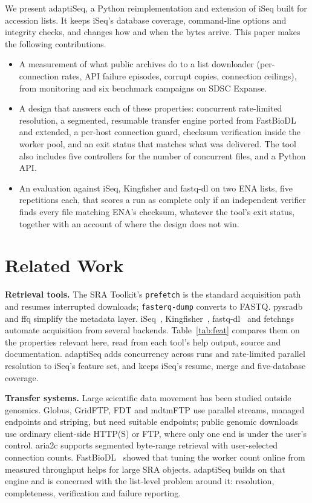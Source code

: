 \documentclass[conference]{IEEEtran}
\begin{document}
We present adaptiSeq, a Python reimplementation and extension of iSeq built for accession lists. It keeps iSeq's database coverage, command-line options and integrity checks, and changes how and when the bytes arrive. This paper makes the following contributions.
\begin{itemize}
\item A measurement of what public archives do to a list downloader (per-connection rates, API failure episodes, corrupt copies, connection ceilings), from monitoring and six benchmark campaigns on SDSC Expanse.
\item A design that answers each of these properties: concurrent rate-limited resolution, a segmented, resumable transfer engine ported from FastBioDL~\cite{fastbiodl} and extended, a per-host connection guard, checksum verification inside the worker pool, and an exit status that matches what was delivered. The tool also includes five controllers for the number of concurrent files, and a Python API.
\item An evaluation against iSeq, Kingfisher and fastq-dl on two ENA lists, five repetitions each, that scores a run as complete only if an independent verifier finds every file matching ENA's checksum, whatever the tool's exit status, together with an account of where the design does not win.
\end{itemize}

\section{Related Work}
\textbf{Retrieval tools.} The SRA Toolkit's \texttt{prefetch} is the standard acquisition path and resumes interrupted downloads; \texttt{fasterq-dump} converts to FASTQ. pysradb~\cite{pysradb} and ffq simplify the metadata layer. iSeq~\cite{iseq}, Kingfisher~\cite{kingfisher}, fastq-dl~\cite{fastqdl} and fetchngs~\cite{fetchngs} automate acquisition from several backends. Table~\ref{tab:feat} compares them on the properties relevant here, read from each tool's help output, source and documentation. adaptiSeq adds concurrency across runs and rate-limited parallel resolution to iSeq's feature set, and keeps iSeq's resume, merge and five-database coverage.

\textbf{Transfer systems.} Large scientific data movement has been studied outside genomics. Globus, GridFTP, FDT and mdtmFTP use parallel streams, managed endpoints and striping, but need suitable endpoints; public genomic downloads use ordinary client-side HTTP(S) or FTP, where only one end is under the user's control. aria2c supports segmented byte-range retrieval with user-selected connection counts. FastBioDL~\cite{fastbiodl} showed that tuning the worker count online from measured throughput helps for large SRA objects. adaptiSeq builds on that engine and is concerned with the list-level problem around it: resolution, completeness, verification and failure reporting.
\end{document}
